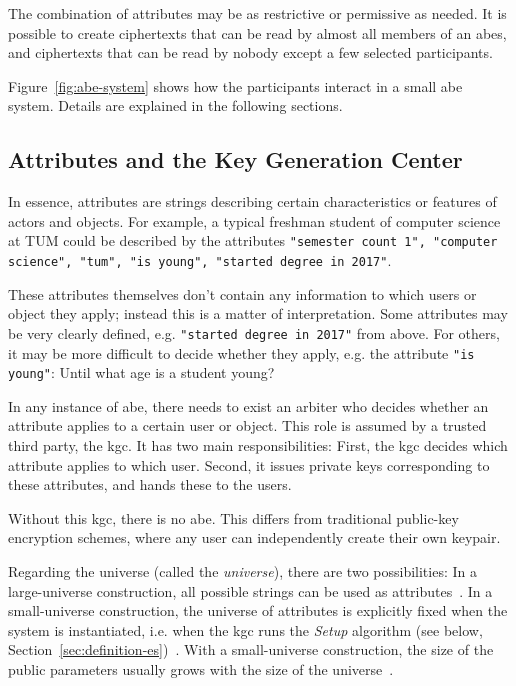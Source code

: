 The combination of attributes may be as restrictive or permissive as needed.
It is possible to create ciphertexts that can be read by almost all members of an \acrshort{abes}, and ciphertexts that can be read by nobody except a few selected participants.

Figure~\ref{fig:abe-system} shows how the participants interact in a small \acrshort{abe} system.
Details are explained in the following sections.

\subsection{Attributes and the Key Generation Center}\label{sec:kgc}



In essence, attributes are strings describing certain characteristics or features of actors and objects.
For example, a typical freshman student of computer science at TUM could be described by the attributes \texttt{"semester count 1", "computer science", "tum", "is young", "started degree in 2017"}.

These attributes themselves don't contain any information to which users or object they apply; instead this is a matter of interpretation.
Some attributes may be very clearly defined, e.g. \texttt{"started degree in 2017"} from above.
For others, it may be more difficult to decide whether they apply, e.g. the attribute \texttt{"is young"}: Until what age is a student young?

In any instance of \acrshort{abe}, there needs to exist an arbiter who decides whether an attribute applies to a certain user or object.
This role is assumed by a trusted third party, the \acrfull{kgc}.
It has two main responsibilities: First, the \acrshort{kgc} decides which attribute applies to which user.
Second, it issues private keys corresponding to these attributes, and hands these to the users.

Without this \acrshort{kgc}, there is no \acrshort{abe}.
This differs from traditional public-key encryption schemes, where any user can independently create their own keypair.

Regarding the \glsdesc{universe} (called the \emph{\gls{universe}}), there are two possibilities:
In a \gls{large-universe} construction, all possible strings can be used as attributes~\cite{goyal_attribute-based_2006}.
In a \gls{small-universe} construction, the universe of attributes is explicitly fixed when the system is instantiated, i.e. when the \acrshort{kgc} runs the \emph{Setup} algorithm (see below, Section~\ref{sec:definition-es})~\cite{goyal_attribute-based_2006}.
With a \gls{small-universe} construction, the size of the public parameters usually grows with the size of the \gls{universe}~\cite{goyal_attribute-based_2006}.

